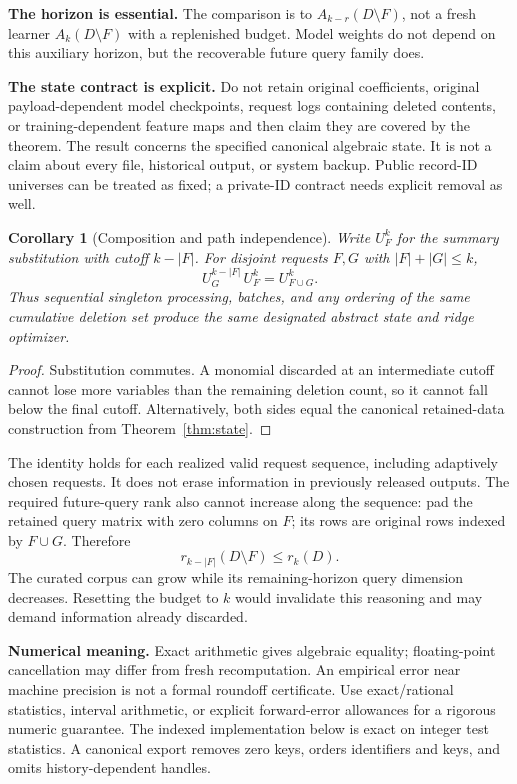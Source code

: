 \documentclass[11pt,a4paper]{article}
\newtheorem{corollary}[theorem]{Corollary}
\theoremstyle{definition}\newtheorem{definition}[theorem]{Definition}
\newcommand{\minus}{\setminus}
\begin{document}
\textbf{The horizon is essential.} The comparison is to $A_{k-r}(D\minus F)$, not a fresh learner $A_k(D\minus F)$ with a replenished budget. Model weights do not depend on this auxiliary horizon, but the recoverable future query family does.

\textbf{The state contract is explicit.} Do not retain original coefficients, original payload-dependent model checkpoints, request logs containing deleted contents, or training-dependent feature maps and then claim they are covered by the theorem. The result concerns the specified canonical algebraic state. It is not a claim about every file, historical output, or system backup. Public record-ID universes can be treated as fixed; a private-ID contract needs explicit removal as well.

\begin{corollary}[Composition and path independence]\label{cor:composition}
Write $U_F^k$ for the summary substitution with cutoff $k-|F|$. For disjoint requests $F,G$ with $|F|+|G|\le k$,
\[
 U_G^{k-|F|}\,U_F^k=U_{F\cup G}^k.
\]
Thus sequential singleton processing, batches, and any ordering of the same cumulative deletion set produce the same designated abstract state and ridge optimizer.
\end{corollary}
\begin{proof}
Substitution commutes. A monomial discarded at an intermediate cutoff cannot lose more variables than the remaining deletion count, so it cannot fall below the final cutoff. Alternatively, both sides equal the canonical retained-data construction from Theorem~\ref{thm:state}.
\end{proof}
The identity holds for each realized valid request sequence, including adaptively chosen requests. It does not erase information in previously released outputs. The required future-query rank also cannot increase along the sequence: pad the retained query matrix with zero columns on $F$; its rows are original rows indexed by $F\cup G$. Therefore
\[
 r_{k-|F|}(D\minus F)\le r_k(D).
\]
The curated corpus can grow while its remaining-horizon query dimension decreases. Resetting the budget to $k$ would invalidate this reasoning and may demand information already discarded.

\textbf{Numerical meaning.} Exact arithmetic gives algebraic equality; floating-point cancellation may differ from fresh recomputation. An empirical error near machine precision is not a formal roundoff certificate. Use exact/rational statistics, interval arithmetic, or explicit forward-error allowances for a rigorous numeric guarantee. The indexed implementation below is exact on integer test statistics. A canonical export removes zero keys, orders identifiers and keys, and omits history-dependent handles.
\end{document}
